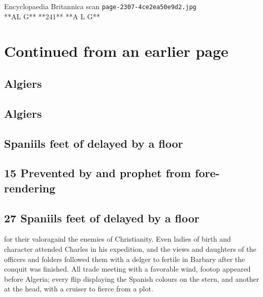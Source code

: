 \documentclass{article}
\begin{document}
\begin{center}
{\Large Encyclopaedia Britannica scan \texttt{page-2307-4ce2ea50e9d2.jpg}}\\[0.5em]
**AL G** **241** **A L G**
\end{center}
\section*{Continued from an earlier page}
\subsection*{Algiers}
\subsection*{Algiers}
\subsection*{Spaniils feet of delayed by a floor}
\subsection*{15 Prevented by and prophet from fore- rendering}
\subsection*{27 Spaniils feet of delayed by a floor}
for their valoragainl the enemies of Christianity. Even ladies of birth and character attended Charles in his expedition, and the views and daughters of the officers and folders followed them with a delger to fertile in Barbary after the conquit was finished. All trade meeting with a favorable wind, footop appeared before Algeria; every flip displaying the Spanish colours on the stern, and another at the head, with a cruiser to fierce from a plot.
\end{document}
